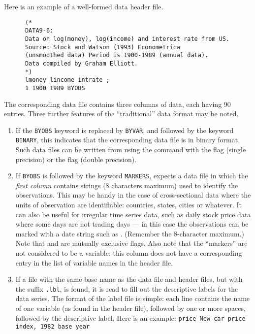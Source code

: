Here is an example of a well-formed data header file.

	
\begin{verbatim} 
	  (* 
	  DATA9-6: 
	  Data on log(money), log(income) and interest rate from US. 
	  Source: Stock and Watson (1993) Econometrica 
	  (unsmoothed data) Period is 1900-1989 (annual data). 
	  Data compiled by Graham Elliott. 
	  *) 
	  lmoney lincome intrate ; 
	  1 1900 1989 BYOBS
\end{verbatim}

The corresponding data file contains three columns of data, each
having 90 entries.  Three further features of the ``traditional'' data
format may be noted.
    
\begin{enumerate}
\item If the \verb+BYOBS+ keyword is replaced by \verb+BYVAR+, and
  followed by the keyword \verb+BINARY+, this indicates that the
  corresponding data file is in binary format.  Such data files can be
  written from  using the  command with the
   flag (single precision) or the  flag (double
  precision).
\item If \verb+BYOBS+ is followed by the keyword \verb+MARKERS+,
   expects a data file in which the \emph{first column}
  contains strings (8 characters maximum) used to identify the
  observations.  This may be handy in the case of cross-sectional data
  where the units of observation are identifiable: countries, states,
  cities or whatever.  It can also be useful for irregular time series
  data, such as daily stock price data where some days are not trading
  days --- in this case the observations can be marked with a date
  string such as .  (Remember the 8-character maximum.)
  Note that  and  are mutually exclusive
  flags.  Also note that the ``markers'' are not considered to be a
  variable: this column does not have a corresponding entry in the
  list of variable names in the header file.
\item If a file with the same base name as the data file and header
  files, but with the suffix \verb+.lbl+, is found, it is read to fill
  out the descriptive labels for the data series. The format of the
  label file is simple: each line contains the name of one variable
  (as found in the header file), followed by one or more spaces,
  followed by the descriptive label. Here is an example:
  \verb+price New car price index, 1982 base year+

	
\end{enumerate}

